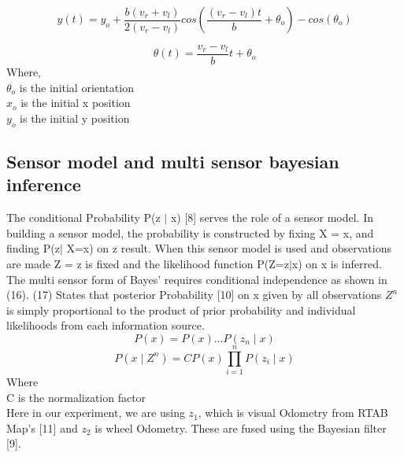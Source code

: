\documentclass[conference]{IEEEtran}
\begin{document}
\begin{equation} \label{eq:16}
y(t)=y_o+\frac{b(v_r+v_l)}{2(v_r-v_l)}cos(\frac{(v_r-v_l)t}{b}+\theta_o)-cos(\theta_o)
\end{equation}

\begin{equation} \label{eq:17}
\theta(t)=\frac{v_r-v_l}{b}t+\theta_o
\end{equation}
Where,\\
$\theta_o$ is the initial orientation\\
$x_o$ is the initial x position\\
$y_o$ is the initial y position\\
\subsection{Sensor model and multi sensor bayesian inference}
The conditional Probability P(z $\mid$ x) [8] serves the role of a sensor model. In building a sensor model, the probability is constructed by fixing X = x, and finding P(z$\mid$ X=x) on z result. When this sensor model is used and observations are made Z = z is fixed and the likelihood function P(Z=z$\mid$x) on x is inferred. The multi sensor form of Bayes’ requires conditional independence as shown in (16). (17) States that posterior Probability [10] on x given by all observations $Z^n$ is simply proportional to the product of prior probability and individual likelihoods from each information source.
\\
\begin{equation} \label{eq:18}
P(x)=P(x)...P(z_n \mid x)
\end{equation}
\begin{equation} \label{eq:19}
P(x \mid Z^n)=CP(x)\prod_{i=1}^{n}P(z_i \mid x)
\end{equation}
Where\\
C is the normalization factor
\\
Here in our experiment, we are using $z_1$, which is visual Odometry from RTAB Map's [11] and $z_2$ is wheel Odometry. These are fused using the Bayesian filter [9].
\end{document}
